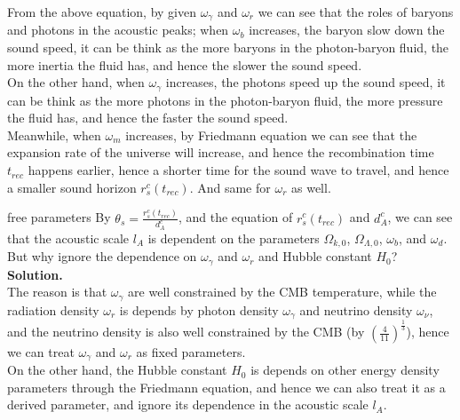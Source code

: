 \bigskip \noindent
\begin{intuition}
    From the above equation, by given $\omega_\gamma$ and $\omega_r$ we can see that the roles of baryons and photons in the acoustic peaks; when $\omega_b$ increases, the baryon slow down the sound speed, it can be think as the more baryons in the photon-baryon fluid, the more inertia the fluid has, and hence the slower the sound speed. \\

    On the other hand, when $\omega_\gamma$ increases, the photons speed up the sound speed, it can be think as the more photons in the photon-baryon fluid, the more pressure the fluid has, and hence the faster the sound speed. \\

    Meanwhile, when $\omega_m$ increases, by Friedmann equation we can see that the expansion rate of the universe will increase, and hence the recombination time $t_{rec}$ happens earlier, hence a shorter time for the sound wave to travel, and hence a smaller sound horizon $r_s^c(t_{rec})$. And same for $\omega_r$ as well.
\end{intuition}

\bigskip \noindent
\begin{example}{free parameters}{}
    By $ \theta_s = \frac{r_s^c(t_{rec})}{d_A^c}$, and the equation of $r_s^c(t_{rec})$ and $d_A^c$, we can see that the acoustic scale $l_A$ is dependent on the parameters $\Omega_{k,0}$, $\Omega_{\Lambda,0}$, $\omega_b$, and $\omega_d$. But why ignore the dependence on $\omega_\gamma$ and $\omega_r$ and Hubble constant $H_0$? \\

    \bigskip \textbf{Solution.}\quad \\
    The reason is that $\omega_\gamma$ are well constrained by the CMB temperature, while the radiation density $\omega_r$ is depends by photon density $\omega_\gamma$ and neutrino density $\omega_\nu$, and the neutrino density is also well constrained by the CMB (by $(\frac{4}{11})^{\frac{1}{3}}$), hence we can treat $\omega_\gamma$ and $\omega_r$ as fixed parameters. \\

    On the other hand, the Hubble constant $H_0$ is depends on other energy density parameters through the Friedmann equation, and hence we can also treat it as a derived parameter, and ignore its dependence in the acoustic scale $l_A$.
\end{example}

